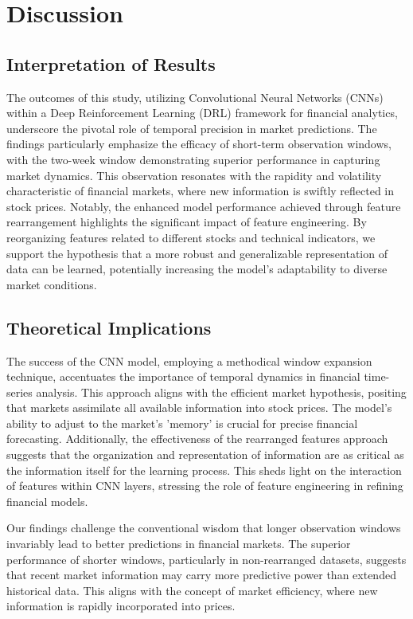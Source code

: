 \section{Discussion}

\subsection{Interpretation of Results}
The outcomes of this study, utilizing Convolutional Neural Networks (CNNs) within a Deep Reinforcement Learning (DRL) framework for financial analytics, underscore the pivotal role of temporal precision in market predictions. The findings particularly emphasize the efficacy of short-term observation windows, with the two-week window demonstrating superior performance in capturing market dynamics. This observation resonates with the rapidity and volatility characteristic of financial markets, where new information is swiftly reflected in stock prices. Notably, the enhanced model performance achieved through feature rearrangement highlights the significant impact of feature engineering. By reorganizing features related to different stocks and technical indicators, we support the hypothesis that a more robust and generalizable representation of data can be learned, potentially increasing the model's adaptability to diverse market conditions.

\subsection{Theoretical Implications}
The success of the CNN model, employing a methodical window expansion technique, accentuates the importance of temporal dynamics in financial time-series analysis. This approach aligns with the efficient market hypothesis, positing that markets assimilate all available information into stock prices. The model's ability to adjust to the market's 'memory' is crucial for precise financial forecasting. Additionally, the effectiveness of the rearranged features approach suggests that the organization and representation of information are as critical as the information itself for the learning process. This sheds light on the interaction of features within CNN layers, stressing the role of feature engineering in refining financial models.

Our findings challenge the conventional wisdom that longer observation windows invariably lead to better predictions in financial markets. The superior performance of shorter windows, particularly in non-rearranged datasets, suggests that recent market information may carry more predictive power than extended historical data. This aligns with the concept of market efficiency, where new information is rapidly incorporated into prices.

